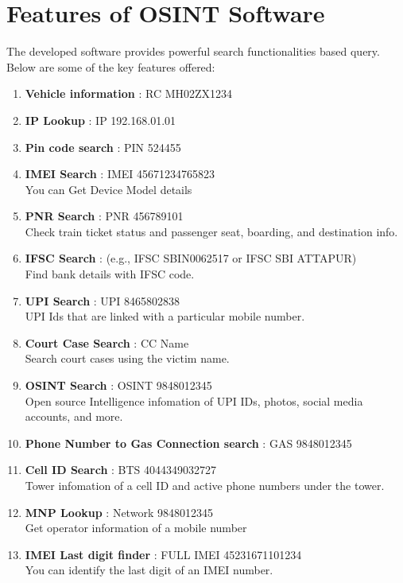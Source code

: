 \section{Features of OSINT Software}\label{sec:features-of-osint-software}

The developed software provides powerful search functionalities based query.
Below are some of the key features offered:

\begin{enumerate}[label=\textbf{\roman*.}]
    \item \textbf{Vehicle information} : RC MH02ZX1234
    \item \textbf{IP Lookup} : IP 192.168.01.01
    \item \textbf{Pin code search} : PIN 524455
    \item \textbf{IMEI Search} : IMEI 45671234765823 \\
        You can Get Device Model details
    \item \textbf{PNR Search} : PNR 456789101 \\
        Check train ticket status and passenger seat, boarding, and destination info.
    \item \textbf{IFSC Search} : (e.g., IFSC SBIN0062517 or IFSC SBI ATTAPUR) \\
        Find bank details with IFSC code.
    \item \textbf{UPI Search} : UPI 8465802838 \\
        UPI Ids that are linked with a particular mobile number.
    \item \textbf{Court Case Search} : CC Name \\
        Search court cases using the victim name.
    \item \textbf{OSINT Search} : OSINT 9848012345 \\
        Open source Intelligence infomation of UPI IDs, photos, social media accounts, and more.
    \item \textbf{Phone Number to Gas Connection search} : GAS 9848012345
    \item \textbf{Cell ID Search} : BTS 4044349032727 \\
        Tower infomation of a cell ID and active phone numbers under the tower.
    \item \textbf{MNP Lookup} : Network 9848012345 \\
        Get operator information of a mobile number
    \item \textbf{IMEI Last digit finder} : FULL IMEI 45231671101234 \\
        You can identify the last digit of an IMEI number.
\end{enumerate}

